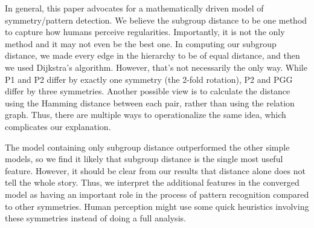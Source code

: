 In general, this paper advocates for a mathematically driven model of symmetry/pattern detection. We believe the subgroup distance to be one method to capture how humans perceive regularities. Importantly, it is not the only method and it may not even be the best one. In computing our subgroup distance, we made every edge in the hierarchy to be of equal distance, and then we used Dijkstra's algorithm. However, that's not necessarily the only way. While P1 and P2 differ by exactly one symmetry (the 2-fold rotation), P2 and PGG differ by three symmetries. Another possible view is to calculate the distance using the Hamming distance between each pair, rather than using the relation graph. Thus, there are multiple ways to operationalize the same idea, which complicates our explanation.

The model containing only subgroup distance outperformed the other simple models, so we find it likely that subgroup distance is the single most useful feature. However, it should be clear from our results that distance alone does not tell the whole story. Thus, we interpret the additional features in the converged model as having an important role in the process of pattern recognition compared to other symmetries. Human perception might use some quick heuristics involving these symmetries instead of doing a full analysis. 

